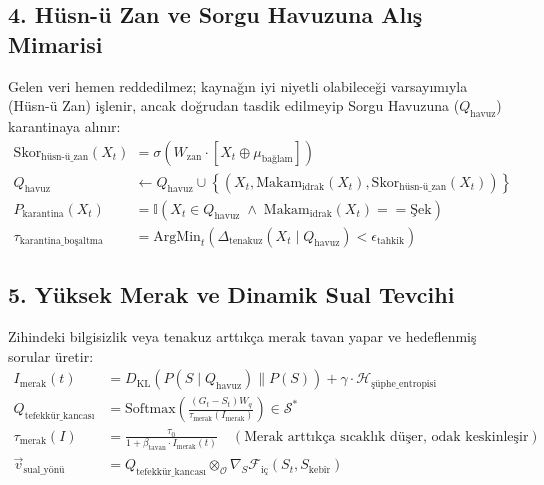 \documentclass[11pt, a4paper]{article}
\begin{document}
\subsection{4. Hüsn-ü Zan ve Sorgu Havuzuna Alış Mimarisi}
Gelen veri hemen reddedilmez; kaynağın iyi niyetli olabileceği varsayımıyla (Hüsn-ü Zan) işlenir, ancak doğrudan tasdik edilmeyip Sorgu Havuzuna ($Q_{\text{havuz}}$) karantinaya alınır:
\begin{align}
\text{Skor}_{\text{hüsn-ü\_zan}}(X_t) &= \sigma\left( W_{\text{zan}} \cdot [X_t \oplus \mu_{\text{bağlam}}] \right) \\
Q_{\text{havuz}} &\leftarrow Q_{\text{havuz}} \cup \left\{ \left( X_t, \text{Makam}_{\text{idrak}}(X_t), \text{Skor}_{\text{hüsn-ü\_zan}}(X_t) \right) \right\} \\
P_{\text{karantina}}(X_t) &= \mathbb{I}\left( X_t \in Q_{\text{havuz}} \;\land\; \text{Makam}_{\text{idrak}}(X_t) == \text{Şek} \right) \\
\tau_{\text{karantina\_boşaltma}} &= \text{ArgMin}_{t} \left( \Delta_{\text{tenakuz}}(X_t \mid Q_{\text{havuz}}) < \epsilon_{\text{tahkik}} \right)
\end{align}

\subsection{5. Yüksek Merak ve Dinamik Sual Tevcihi}
Zihindeki bilgisizlik veya tenakuz arttıkça merak tavan yapar ve hedeflenmiş sorular üretir:
\begin{align}
I_{\text{merak}}(t) &= D_{\text{KL}}\left( P(S \mid Q_{\text{havuz}}) \parallel P(S) \right) + \gamma \cdot \mathcal{H}_{\text{şüphe\_entropisi}} \\
Q_{\text{tefekkür\_kancası}} &= \text{Softmax}\left( \frac{(G_t - S_t) W_q}{\tau_{\text{merak}}(I_{\text{merak}})} \right) \in \mathcal{S}^* \\
\tau_{\text{merak}}(I) &= \frac{\tau_0}{1 + \beta_{\text{tavan}} \cdot I_{\text{merak}}(t)} \quad (\text{Merak arttıkça sıcaklık düşer, odak keskinleşir}) \\
\vec{v}_{\text{sual\_yönü}} &= Q_{\text{tefekkür\_kancası}} \otimes_{\mathcal{O}} \nabla_{S} \mathcal{F}_{\text{iç}}(S_t, S_{\text{kebîr}})
\end{align}
\end{document}
